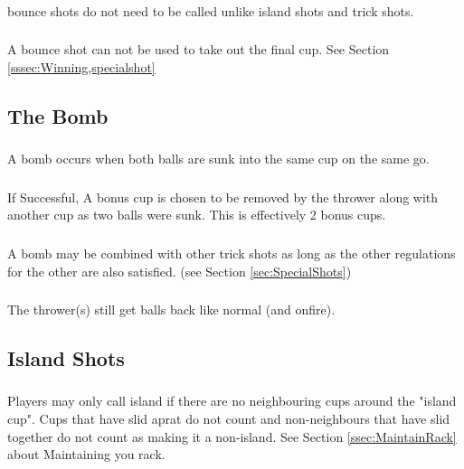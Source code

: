 		\subsubsection{}\label{sssec:BounceShots,calling}
			bounce shots do not need to be called unlike island shots and trick shots.
		\subsubsection{}\label{sssec:BounceShots,winning}
			A bounce shot can not be used to take out the final cup.
            See Section \ref{sssec:Winning,specialshot}

	\subsection{The  Bomb}\label{ssec:Bomb}
		\subsubsection{}\label{sssec:Bomb,condition}
			A bomb occurs when both balls are sunk into the same cup on the same go. 
		\subsubsection{}\label{sssec:Bomb,success}
			If Successful, A bonus cup is chosen to be removed by the thrower along with another cup as two balls were sunk.
            This is effectively 2 bonus cups.
		\subsubsection{}\label{sssec:Bomb,combo}
			A bomb may be combined with other trick shots as long as the other regulations for the other are also satisfied.
            (see Section \ref{sec:SpecialShots})
		\subsubsection{}\label{sssec:Bomb,ballback}
			The thrower(s) still get balls back like normal (and onfire).

	\subsection{Island Shots}\label{ssec:IslandShots}
		\subsubsection{}\label{sssec:IslandShots,conditon}
			Players may only call island if there are no neighbouring cups around the "island cup".
            Cups that have slid aprat do not count and non-neighbours that have slid together do not count as making it a non-island.
            See Section \ref{ssec:MaintainRack} about Maintaining you rack.
